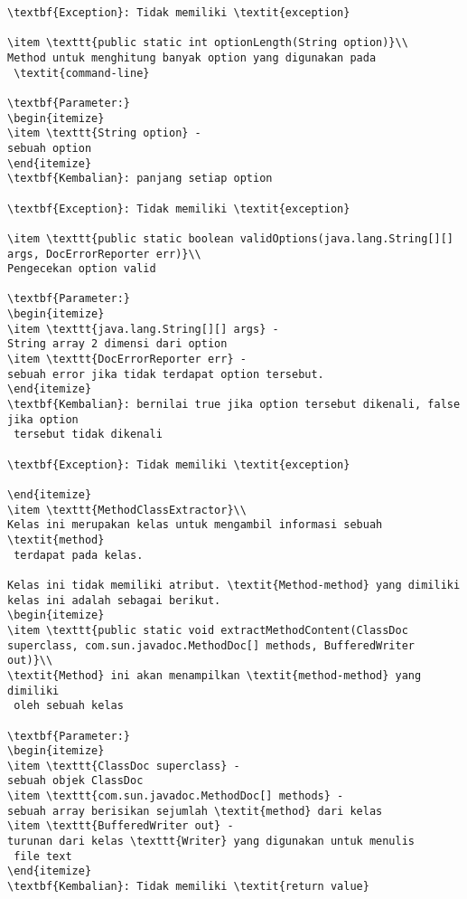 \begin{lstlisting}[caption=Hasil Implementasi]
\textbf{Exception}: Tidak memiliki \textit{exception}

\item \texttt{public static int optionLength(String option)}\\ 
Method untuk menghitung banyak option yang digunakan pada
 \textit{command-line}

\textbf{Parameter:}
\begin{itemize}
\item \texttt{String option} - 
sebuah option
\end{itemize}
\textbf{Kembalian}: panjang setiap option

\textbf{Exception}: Tidak memiliki \textit{exception}

\item \texttt{public static boolean validOptions(java.lang.String[][] args, DocErrorReporter err)}\\ 
Pengecekan option valid

\textbf{Parameter:}
\begin{itemize}
\item \texttt{java.lang.String[][] args} - 
String array 2 dimensi dari option
\item \texttt{DocErrorReporter err} - 
sebuah error jika tidak terdapat option tersebut.
\end{itemize}
\textbf{Kembalian}: bernilai true jika option tersebut dikenali, false jika option
 tersebut tidak dikenali

\textbf{Exception}: Tidak memiliki \textit{exception}

\end{itemize}
\item \texttt{MethodClassExtractor}\\ 
Kelas ini merupakan kelas untuk mengambil informasi sebuah \textit{method}
 terdapat pada kelas.

Kelas ini tidak memiliki atribut. \textit{Method-method} yang dimiliki kelas ini adalah sebagai berikut.
\begin{itemize}
\item \texttt{public static void extractMethodContent(ClassDoc superclass, com.sun.javadoc.MethodDoc[] methods, BufferedWriter out)}\\ 
\textit{Method} ini akan menampilkan \textit{method-method} yang dimiliki
 oleh sebuah kelas

\textbf{Parameter:}
\begin{itemize}
\item \texttt{ClassDoc superclass} - 
sebuah objek ClassDoc
\item \texttt{com.sun.javadoc.MethodDoc[] methods} - 
sebuah array berisikan sejumlah \textit{method} dari kelas
\item \texttt{BufferedWriter out} - 
turunan dari kelas \texttt{Writer} yang digunakan untuk menulis
 file text
\end{itemize}
\textbf{Kembalian}: Tidak memiliki \textit{return value}


\end{lstlisting}
